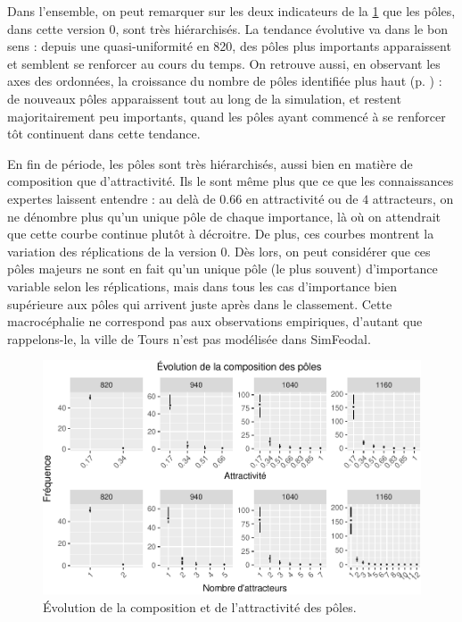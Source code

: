\begin{mdframed}[backgroundcolor=gray!10,footnoteinside=false]
	Dans l'ensemble, on peut remarquer sur les deux indicateurs de la \cref{fig:compo-poles-v0} que les pôles, dans cette version 0, sont très hiérarchisés.
La tendance \og évolutive va dans le bon sens :
depuis une quasi-uniformité en 820, des pôles plus importants apparaissent et semblent se renforcer au cours du temps.
On retrouve aussi, en observant les axes des ordonnées, la croissance du nombre de pôles identifiée plus haut (p. \pageref{para:nb-poles}) :
de nouveaux pôles apparaissent tout au long de la simulation, et restent majoritairement peu importants, quand les pôles ayant commencé à se renforcer tôt continuent dans cette tendance.
	
	En fin de période, les pôles sont très hiérarchisés, aussi bien en matière de composition que d'attractivité.
Ils le sont même plus que ce que les connaissances expertes laissent entendre :
au delà de $0.66$ en attractivité ou de $4$ attracteurs, on ne dénombre plus qu'un unique pôle de chaque importance, là où on attendrait que cette courbe continue plutôt à décroitre.
	De plus, ces courbes montrent la variation des réplications de la version 0.
	Dès lors, on peut considérer que ces pôles majeurs ne sont en fait qu'un unique pôle (le plus souvent) d'importance variable selon les réplications, mais dans tous les cas d'importance bien supérieure aux pôles qui arrivent juste après dans le classement.
Cette macrocéphalie ne correspond pas aux observations empiriques, d'autant que rappelons-le, la ville de Tours n'est pas modélisée dans SimFeodal.	
	

\end{mdframed}

\begin{figure}[H]
	\captionsetup{width=\linewidth}
	\includegraphics[width=\linewidth]{img/resultats/v0_compo_poles.pdf}
	\caption{Évolution de la composition et de l'attractivité des pôles\protect\footnotemark{}.} 
	\label{fig:compo-poles-v0}
\end{figure}

